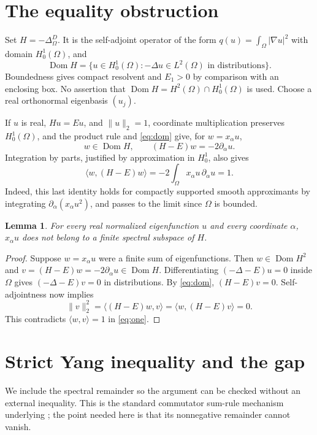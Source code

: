 \documentclass[10pt]{article}
\newtheorem{lemma}[theorem]{Lemma}
\newcommand{\Dom}{\operatorname{Dom}}
\begin{document}
\section{The equality obstruction}
Set $H=-\Delta_\Omega^D$. It is the self-adjoint operator of the form
$q(u)=\int_\Omega|\nabla u|^2$ with domain $H_0^1(\Omega)$, and
\begin{equation}\label{eq:dom}
 \Dom H=\{u\in H_0^1(\Omega):-\Delta u\in L^2(\Omega)
 \text{ in distributions}\}.
\end{equation}
Boundedness gives compact resolvent and $E_1>0$ by comparison with an enclosing box. No assertion that $\Dom H=H^2(\Omega)\cap H_0^1(\Omega)$ is used.
Choose a real orthonormal eigenbasis $(u_j)$.

If $u$ is real, $Hu=Eu$, and $\|u\|_2=1$, coordinate multiplication preserves $H_0^1(\Omega)$, and the product rule and \eqref{eq:dom} give, for $w=x_\alpha u$,
\begin{equation}\label{eq:comm}
 w\in\Dom H,\qquad (H-E)w=-2\partial_\alpha u.
\end{equation}
Integration by parts, justified by approximation in $H_0^1$, also gives
\begin{equation}\label{eq:one}
 \langle w,(H-E)w\rangle
 =-2\int_\Omega x_\alpha u\,\partial_\alpha u=1.
\end{equation}
Indeed, this last identity holds for compactly supported smooth approximants by integrating $\partial_\alpha(x_\alpha u^2)$, and passes to the limit since $\Omega$ is bounded.

\begin{lemma}\label{lem:support}
For every real normalized eigenfunction $u$ and every coordinate $\alpha$, $x_\alpha u$ does not belong to a finite spectral subspace of $H$.
\end{lemma}
\begin{proof}
Suppose $w=x_\alpha u$ were a finite sum of eigenfunctions. Then $w\in\Dom H^2$ and $v=(H-E)w=-2\partial_\alpha u\in\Dom H$. Differentiating $(-\Delta-E)u=0$ inside $\Omega$ gives $(-\Delta-E)v=0$ in distributions. By \eqref{eq:dom}, $(H-E)v=0$. Self-adjointness now implies
\[
 \|v\|_2^2=\langle (H-E)w,v\rangle
 =\langle w,(H-E)v\rangle=0.
\]
This contradicts $\langle w,v\rangle=1$ in \eqref{eq:one}.
\end{proof}

\section{Strict Yang inequality and the gap}
We include the spectral remainder so the argument can be checked without an external inequality. This is the standard commutator sum-rule mechanism underlying \cite{HS,LP,HS10}; the point needed here is that its nonnegative remainder cannot vanish.
\end{document}
